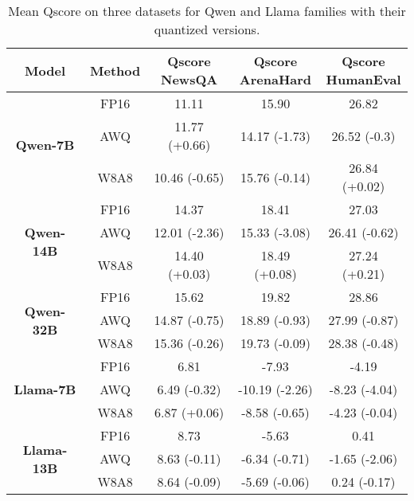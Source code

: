 \begin{table}[!t]
\centering
\caption{Mean Qscore on three datasets for Qwen and Llama families with their quantized versions.}
\label{tab:quant_qscore}
\begin{adjustbox}{width=0.48\textwidth}
\begin{tabular}{c|c|c|c|c}
\toprule
\textbf{Model} & \textbf{Method}  & \makecell{\textbf{Qscore}\\\footnotesize{NewsQA}} & \makecell{\textbf{Qscore}\\\footnotesize{ArenaHard}} & \makecell{\textbf{Qscore}\\\footnotesize{HumanEval}}  \\
\midrule
\multirow{3}{*}{\textbf{Qwen-7B}} & FP16  & 11.11 & 15.90 & 26.82  \\
 & AWQ  & 11.77 {\color{green} (+0.66)} & 14.17 {\color{red} (-1.73)} & 26.52 {\color{red} (-0.3)}  \\
 & W8A8  & 10.46 {\color{red} (-0.65)} & 15.76 {\color{red} (-0.14)} & 26.84 {\color{green} (+0.02)} \\
\hline
\multirow{3}{*}{\textbf{Qwen-14B}} & FP16  & 14.37 & 18.41 & 27.03  \\
 & AWQ  & 12.01 {\color{red} (-2.36)} & 15.33 {\color{red} (-3.08)} & 26.41 {\color{red} (-0.62)}  \\
 & W8A8  & 14.40 {\color{green} (+0.03)} & 18.49 {\color{green} (+0.08)} & 27.24 {\color{green} (+0.21)} \\
\hline
\multirow{3}{*}{\textbf{Qwen-32B}} & FP16  & 15.62 & 19.82 & 28.86  \\
 & AWQ  & 14.87 {\color{red} (-0.75)} & 18.89 {\color{red} (-0.93)} & 27.99 {\color{red} (-0.87)}  \\
 & W8A8  & 15.36 {\color{red} (-0.26)} & 19.73 {\color{red} (-0.09)} & 28.38 {\color{red} (-0.48)} \\
\hline
\multirow{3}{*}{\textbf{Llama-7B}} & FP16  & 6.81 & -7.93 & -4.19  \\
 & AWQ  & 6.49 {\color{red} (-0.32)} & -10.19 {\color{red} (-2.26)} & -8.23 {\color{red} (-4.04)}  \\
 & W8A8  & 6.87 {\color{green} (+0.06)} & -8.58 {\color{red} (-0.65)} & -4.23 {\color{red} (-0.04)} \\
\hline
\multirow{3}{*}{\textbf{Llama-13B}} & FP16  & 8.73 & -5.63 & 0.41  \\
 & AWQ  & 8.63 {\color{red} (-0.11)} & -6.34 {\color{red} (-0.71)} & -1.65 {\color{red} (-2.06)}  \\
 & W8A8  & 8.64 {\color{red} (-0.09)} & -5.69 {\color{red} (-0.06)} & 0.24 {\color{red} (-0.17)} \\
\bottomrule
\end{tabular}
\end{adjustbox}
\end{table}

